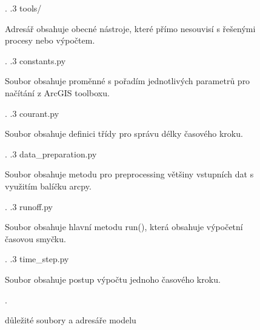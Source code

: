 \begin{figure}[th!]
{{\begin{minipage}[t]{\pomer\textwidth}
                             \end{minipage}.
.3 tools/    \dotfill \begin{minipage}[t]{\pomer\textwidth}
		Adresář obsahuje obecné nástroje, které přímo nesouvisí s řešenými procesy nebo výpočtem{.}
		\end{minipage}.
.3 constants.py    \dotfill \begin{minipage}[t]{\pomer\textwidth}
		    Soubor obsahuje proměnné s pořadím jednotlivých parametrů pro načítání z ArcGIS toolboxu{.}
		    \end{minipage}.
.3 courant.py    \dotfill \begin{minipage}[t]{\pomer\textwidth}
		    Soubor obsahuje definici třídy pro správu délky časového kroku{.}
		    \end{minipage}.
.3 data\_preparation.py    \dotfill \begin{minipage}[t]{\pomer\textwidth}
		    Soubor obsahuje metodu pro preprocessing většiny vstupních dat s využitím balíčku arcpy{.}
		    \end{minipage}.
.3 runoff.py    \dotfill \begin{minipage}[t]{\pomer\textwidth}
		    Soubor obsahuje hlavní metodu run(), která obsahuje výpočetní časovou smyčku{.}
		    \end{minipage}.
.3 time\_step.py  \dotfill \begin{minipage}[t]{\pomer\textwidth}
		    Soubor obsahuje postup výpočtu jednoho časového kroku{.}
		    \end{minipage}.
}
}
\caption{důležité soubory a adresáře modelu \smod}
\label{fig:adresare}
\end{figure}
\restoregeometry